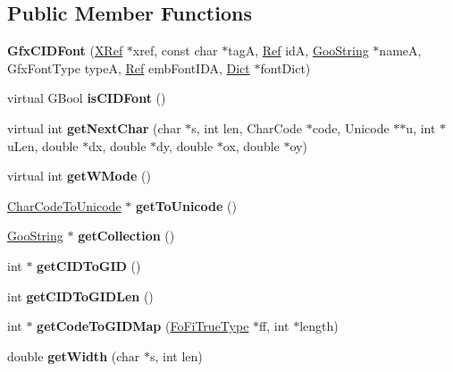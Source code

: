 \subsection*{Public Member Functions}
\begin{DoxyCompactItemize}
\item 
\mbox{\label{class_gfx_c_i_d_font_a6f4a64e282242e9ecc35ed204a416bd1}} 
{\bfseries Gfx\+C\+I\+D\+Font} (\hyperlink{class_x_ref}{X\+Ref} $\ast$xref, const char $\ast$tagA, \hyperlink{struct_ref}{Ref} idA, \hyperlink{class_goo_string}{Goo\+String} $\ast$nameA, Gfx\+Font\+Type typeA, \hyperlink{struct_ref}{Ref} emb\+Font\+I\+DA, \hyperlink{class_dict}{Dict} $\ast$font\+Dict)
\item 
\mbox{\label{class_gfx_c_i_d_font_af238fc1ccdd061f4768dc4dbd151c80c}} 
virtual G\+Bool {\bfseries is\+C\+I\+D\+Font} ()
\item 
\mbox{\label{class_gfx_c_i_d_font_ac038e7d7b2c91ba04f03f8dd5b1bed42}} 
virtual int {\bfseries get\+Next\+Char} (char $\ast$s, int len, Char\+Code $\ast$code, Unicode $\ast$$\ast$u, int $\ast$u\+Len, double $\ast$dx, double $\ast$dy, double $\ast$ox, double $\ast$oy)
\item 
\mbox{\label{class_gfx_c_i_d_font_a12485e746fb9151ab50c965bacc2ed8b}} 
virtual int {\bfseries get\+W\+Mode} ()
\item 
\mbox{\label{class_gfx_c_i_d_font_aaa08b03a018d32d2c0e18ad83b95fe0b}} 
\hyperlink{class_char_code_to_unicode}{Char\+Code\+To\+Unicode} $\ast$ {\bfseries get\+To\+Unicode} ()
\item 
\mbox{\label{class_gfx_c_i_d_font_ab65805c17909b688a99e90b107ab3535}} 
\hyperlink{class_goo_string}{Goo\+String} $\ast$ {\bfseries get\+Collection} ()
\item 
\mbox{\label{class_gfx_c_i_d_font_a101c2289710134597b3cb7c1b6f498d3}} 
int $\ast$ {\bfseries get\+C\+I\+D\+To\+G\+ID} ()
\item 
\mbox{\label{class_gfx_c_i_d_font_ac25f4f34286b78d12807c2d5811763ea}} 
int {\bfseries get\+C\+I\+D\+To\+G\+I\+D\+Len} ()
\item 
\mbox{\label{class_gfx_c_i_d_font_a18b7b94207ead06ea52b39803e4aa41e}} 
int $\ast$ {\bfseries get\+Code\+To\+G\+I\+D\+Map} (\hyperlink{class_fo_fi_true_type}{Fo\+Fi\+True\+Type} $\ast$ff, int $\ast$length)
\item 
\mbox{\label{class_gfx_c_i_d_font_a7ef4dba9eac35b7331e73b0dbd4e0b63}} 
double {\bfseries get\+Width} (char $\ast$s, int len)
\end{DoxyCompactItemize}

